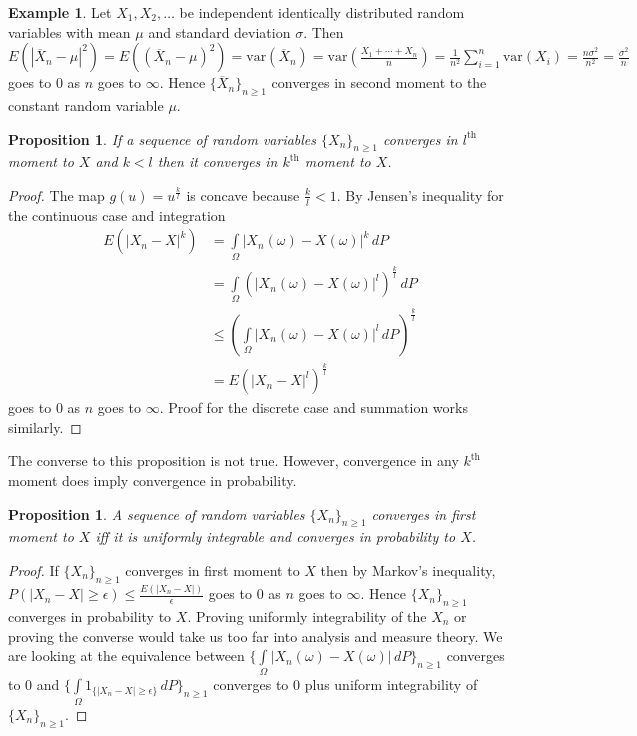 \documentclass[12pt]{amsart}
\newtheorem{proposition}[theorem]{Proposition}
\theoremstyle{definition}
\newtheorem{example}[theorem]{Example}
\begin{document}
\begin{example} \label{averages_converge_to_mu} Let $X_1, X_2, \dots$ be independent identically distributed random variables with mean $\mu$ and standard deviation $\sigma$. Then $E(|\overline{X}_n - \mu|^2) = E((\overline{X}_n - \mu)^2) = \text{var}(\overline{X}_n) = \text{var}(\frac{X_1 + \cdots + X_n}{n}) = \frac{1}{n^2} \sum\limits_{i = 1}^n \text{var}(X_i) = \frac{n \sigma^2}{n^2} = \frac{\sigma^2}{n}$ goes to 0 as $n$ goes to $\infty$. Hence $\{\overline{X}_n\}_{n \geq 1}$ converges in second moment to the constant random variable $\mu$.
\end{example}

\begin{proposition} \label{convergenceinmoments} If a sequence of random variables $\{X_n\}_{n \geq 1}$ converges in $l^{\text{th}}$ moment to $X$ and $k < l$ then it converges in $k^{\text{th}}$ moment to $X$.
\end{proposition}
\begin{proof} The map $g(u) = u^{\frac{k}{l}}$ is concave because $\frac{k}{l} < 1$. By Jensen's inequality for the continuous case and integration
\begin{align*}
E(|X_n - X|^k) & = \int\limits_{\Omega} |X_n(\omega) - X(\omega)|^k \, dP \\
 & = \int\limits_{\Omega} (|X_n(\omega) - X(\omega)|^l)^{\frac{k}{l}} \, dP \\
 & \leq \left( \int\limits_{\Omega} |X_n(\omega) - X(\omega)|^l \, dP \right)^{\frac{k}{l}} \\
 & = E(|X_n - X|^l)^{\frac{k}{l}}
\end{align*}
goes to 0 as $n$ goes to $\infty$. Proof for the discrete case and summation works similarly.
\end{proof}

The converse to this proposition is not true. However, convergence in any $k^{\text{th}}$ moment does imply convergence in probability.

\begin{proposition} \label{convergencein1stmomentconvergenceinprobability} A sequence of random variables $\{X_n\}_{n \geq 1}$ converges in first moment to $X$ iff it is uniformly integrable and converges in probability to $X$. 
\end{proposition}
\begin{proof} If $\{X_n\}_{n \geq 1}$ converges in first moment to $X$ then by Markov's inequality, $P(|X_n - X| \geq \epsilon) \leq \frac{E(|X_n - X|)}{\epsilon}$ goes to $0$ as $n$ goes to $\infty$. Hence $\{X_n\}_{n \geq 1}$ converges in probability to $X$. Proving uniformly integrability of the $X_n$ or proving the converse would take us too far into analysis and measure theory. We are looking at the equivalence between $\{\int\limits_{\Omega} |X_n(\omega) - X(\omega)| \, dP \}_{n \geq 1}$ converges to 0 and $\{\int\limits_{\Omega} 1_{\{|X_n - X| \geq \epsilon\}} \, dP \}_{n \geq 1}$ converges to 0 plus uniform integrability of $\{X_n\}_{n \geq 1}$.
\end{proof}
\end{document}
